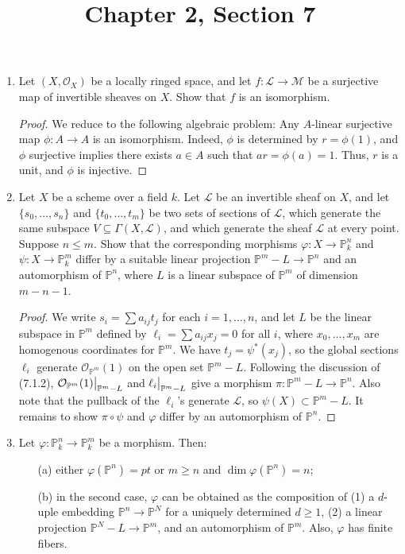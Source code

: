 \documentclass{article}
\title{Chapter 2, Section 7}
\newcommand{\fO}{\mathcal{O}}
\newcommand{\fL}{\mathcal{L}}
\newcommand{\fM}{\mathcal{M}}
\newcommand{\PP}{\mathbb{P}}
\newcommand\restr[2]{{%
  \left.\kern-\nulldelimiterspace %
  #1 %
  \vphantom{\big|} %
  \right|_{#2} %
}}
\begin{document}
\maketitle
\begin{enumerate} [label=\textbf{\arabic*.}, leftmargin=-0em]


\item Let $(X, \fO_X)$ be a locally ringed space, and let $f : \fL \to \fM$ be a surjective map of invertible sheaves on $X$. Show that $f$ is an isomorphism.

\begin{proof}
    We reduce to the following algebraic problem: Any $A$-linear surjective map $\phi : A \to A$ is an isomorphism. Indeed, $\phi$ is determined by $r = \phi(1)$, and $\phi$ surjective implies there exists $a \in A$ such that $ar = \phi(a) = 1$. Thus, $r$ is a unit, and $\phi$ is injective.
\end{proof}

\item Let $X$ be a scheme over a field $k$. Let $\fL$ be an invertible sheaf on $X$, and let $\{ s_0, \dots, s_n \}$ and $\{ t_0, \dots, t_m \}$ be two sets of sections of $\fL$, which generate the same subspace $V \subseteq \Gamma(X, \fL)$, and which generate the sheaf $\fL$ at every point. Suppose $n \leq m$. Show that the corresponding morphisms $\varphi : X \to \PP_k^n$ and $\psi : X \to \PP_k^m$ differ by a suitable linear projection $\PP^m - L \to \PP^n$ and an automorphism of $\PP^n$, where $L$ is a linear subspace of $\PP^m$ of dimension $m - n - 1$.

\begin{proof}
    We write $s_i = \sum a_{ij} t_j$ for each $i = 1, \dots, n$, and let $L$ be the linear subspace in $\PP^m$ defined by $\ell_i = \sum a_{ij} x_j = 0$ for all $i$, where $x_0, \dots, x_m$ are homogenous coordinates for $\PP^m$. We have $t_j = \psi^*(x_j)$, so the global sections $\ell_i$ generate $\fO_{\PP^m}(1)$ on the open set $\PP^m - L$. Following the discussion of (7.1.2), $\restr{\fO_{\PP^m}(1)}{\PP^m - L}$ and $\restr{\ell_i}{\PP^m - L}$ give a morphism $\pi : \PP^m - L \to \PP^n$. Also note that the pullback of the $\ell_i$'s generate $\fL$, so $\psi(X) \subset \PP^m - L$. It remains to show $\pi \circ \psi$ and $\varphi$ differ by an automorphism of $\PP^n$.
\end{proof}

\item Let $\varphi : \PP_k^n \to \PP_k^m$ be a morphism. Then:
\begin{itemize}
    \item[(a)] either $\varphi(\PP^n) = pt$ or $m \geq n$ and $\dim{\varphi(\PP^n)} = n$;
    \item[(b)] in the second case, $\varphi$ can be obtained as the composition of (1) a $d$-uple embedding $\PP^n \to \PP^N$ for a uniquely determined $d \geq 1$, (2) a linear projection $\PP^N - L \to \PP^m$, and an automorphism of $\PP^m$. Also, $\varphi$ has finite fibers.
\end{itemize}


\end{enumerate}
\end{document}
